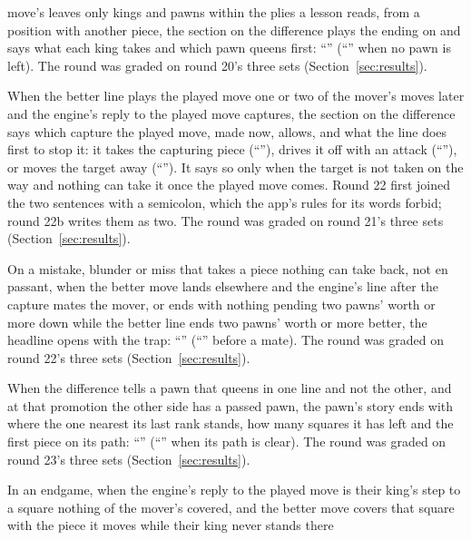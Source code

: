 \documentclass[11pt]{article}
\begin{document}
\begin{description}[style=nextline, nosep]
move's leaves only kings and pawns within the plies a lesson reads, from a position with another
piece, the section on the difference plays the ending on and says what each king takes and which
pawn queens first: ``\RoundTwentyOneQuote'' (``\RoundTwentyOneQuoteDraw'' when no pawn is left).
The round was graded on round 20's three sets (Section~\ref{sec:results}).
\item[Round 22: what the better line does first.] When the better line plays the played move one or
two of the mover's moves later and the engine's reply to the played move captures, the section on
the difference says which capture the played move, made now, allows, and what the line does first
to stop it: it takes the capturing piece (``\RoundTwentyTwoQuote''), drives it off with an attack
(``\RoundTwentyTwoQuoteDrive''), or moves the target away (``\RoundTwentyTwoQuoteAway''). It says
so only when the target is not taken on the way and nothing can take it once the played move comes.
Round 22 first joined the two sentences with a semicolon, which the app's rules for its words
forbid; round 22b writes them as two. The round was graded on round 21's three sets
(Section~\ref{sec:results}).
\item[Round 23: the capture that was a trap.] On a mistake, blunder or miss that takes a piece
nothing can take back, not en passant, when the better move lands elsewhere and the engine's line
after the capture mates the mover, or ends with nothing pending two pawns' worth or more down while
the better line ends two pawns' worth or more better, the headline opens with the trap:
``\RoundTwentyThreeQuote'' (``\RoundTwentyThreeQuoteMate'' before a mate). The round was graded
on round 22's three sets (Section~\ref{sec:results}).
\item[Round 24: where the other side's pawn is when one queens.] When the difference tells a pawn
that queens in one line and not the other, and at that promotion the other side has a passed pawn,
the pawn's story ends with where the one nearest its last rank stands, how many squares it has left
and the first piece on its path: ``\RoundTwentyFourQuote'' (``\RoundTwentyFourQuoteClear'' when
its path is clear). The round was graded on round 23's three sets (Section~\ref{sec:results}).
\item[Round 25: the square the better move keeps their king out of.] In an endgame, when the
engine's reply to the played move is their king's step to a square nothing of the mover's covered,
and the better move covers that square with the piece it moves while their king never stands there

\end{description}
\end{document}
